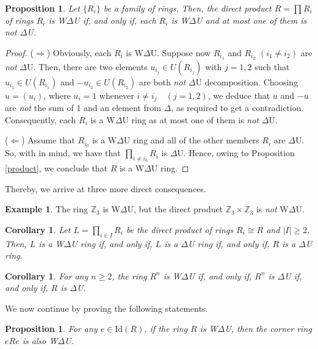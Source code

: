 \documentclass[12pt]{amsart}
\newtheorem{proposition}[theorem]{Proposition}
\newtheorem{corollary}[theorem]{Corollary}
\theoremstyle{definition}
\newtheorem{example}[theorem]{Example}
\begin{document}
\begin{proposition}\label{productt}
Let $\{R_i\}$ be a family of rings. Then, the direct product $R=\prod R_i$ of rings $R_i$ is W$\Delta$U if, and only if, each $R_i$ is W$\Delta$U and at most one of them is {\it not} $\Delta$U.
\end{proposition}

\begin{proof}
($\Rightarrow$) Obviously, each $R_i$ is W$\Delta$U. Suppose now $R_{i_1}$ and $R_{i_2}$ $(i_1 \neq i_2)$ are {\it not} $\Delta$U. Then, there are two elements $u_{i_j} \in U (R_{i_j})$ with $j=1,2$ such that $u_{i_1} \in U (R_{i_1})$ and $-u_{i_2} \in U (R_{i_2})$ are both {\it not} $\Delta$U decomposition. Choosing $u=(u_i)$, where $u_i=1$ whenever $i \neq i_{j}\quad (j=1,2)$, we deduce that $u$ and $-u$ are {\it not} the sum of 1 and an element from $\Delta$, as required to get a contradiction. Consequently, each $R_i$ is a W$\Delta$U ring as at most one of them is {\it not} $\Delta$U.

($\Leftarrow$) Assume that $R_{i_0}$ is a W$\Delta$U ring and all of the other members $R_i$ are $\Delta$U. So, with \cite[Proposition 2.4(6)]{7} in mind, we have that $\prod_{i \neq i_{0}} R_i$ is $\Delta$U. Hence, owing to Proposition \ref{product}, we conclude that $R$ is a W$\Delta$U ring.
\end{proof}

Thereby, we arrive at three more direct consequences.

\begin{example}
The ring $\mathbb{Z}_{3}$ is W$\Delta$U, but the direct product $\mathbb{Z}_{3}\times \mathbb{Z}_{3}$ is {\it not} W$\Delta$U.
\end{example}

\begin{corollary}
Let $L=\prod_{i \in I} R_i$ be the direct product of rings $R_i \cong R$ and $|I| \geq 2$. Then, $L$ is a W$\Delta$U ring if, and only if, $L$ is a $\Delta$U ring if, and only if, $R$ is a $\Delta$U ring.
\end{corollary}

\begin{corollary}\label{10}
For any $n \geq 2$, the ring $R^n$ is W$\Delta$U if, and only if, $R^n$ is $\Delta$U if, and only if, $R$ is $\Delta$U.
\end{corollary}

We now continue by proving the following statements. 

\begin{proposition}\label{corner}
For any \( e \in \text{Id}(R) \), if the ring \( R \) is W$\Delta$U, then the corner ring \( eRe \) is also W$\Delta$U.
\end{proposition}
\end{document}
